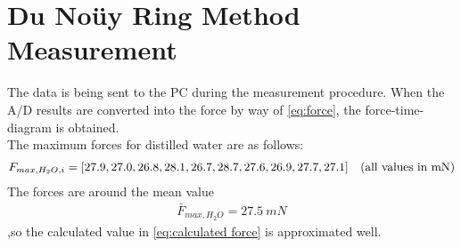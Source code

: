 \section{Du Noüy Ring Method Measurement}
The data is being sent to the PC during the measurement procedure. When the A/D results are converted into the force by way of \cref{eq:force}, the force-time-diagram is obtained.\\
The maximum forces for distilled water are as follows:
\begin{align*}
F_{max,H_2O,i}=[27.9, 27.0, 26.8, 28.1, 26.7, 28.7, 27.6, 26.9, 27.7, 27.1] \quad \text{(all values in \SI{}{mN})}
\end{align*}
The forces are around the mean value
\begin{align*}
\bar{F}_{max,H_2O}=\SI{27.5}{mN}
\end{align*}
,so the calculated value in \cref{eq:calculated force} is approximated well.

